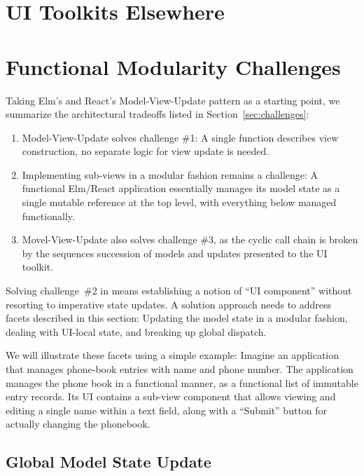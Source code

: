 \documentclass[sigplan,screen]{acmart}
\begin{document}
\section{UI Toolkits Elsewhere}
\label{sec:ui-toolkits-elsewhere}

\section{Functional Modularity Challenges}
\label{sec:modularity-challenges}

Taking Elm's and React's Model-View-Update pattern as a starting
point, we summarize the architectural tradeoffs listed in
Section~\ref{sec:challenges}:
%
\begin{enumerate}
\item Model-View-Update solves challenge \#1: A single function
  describes view construction, no separate logic for view update is
  needed.
\item Implementing sub-views in a modular fashion remains a challenge:
  A functional Elm/React application essentially manages its model
  state as a single mutable reference at the top level, with
  everything below managed functionally.
\item Movel-View-Update also solves challenge \#3, as the cyclic call
  chain is broken by the sequences succession of models and updates
  presented to the UI toolkit.
\end{enumerate}
%
Solving challenge~\#2 in means establishing a notion of ``UI
component'' without resorting to imperative state updates.  A solution
approach needs to address facets described in this section: Updating
the model state in a modular fashion, dealing with UI-local state, and
breaking up global dispatch.

We will illustrate these facets using a simple example: Imagine an
application that manages phone-book entries with name and phone
number.  The application manages the phone book in a functional
manner, as a functional list of immutable entry records.  Its UI
contains a sub-view component that allows viewing and editing a single
name within a text field, along with a ``Submit'' button for actually
changing the phonebook.


\subsection{Global Model State Update}
\end{document}
